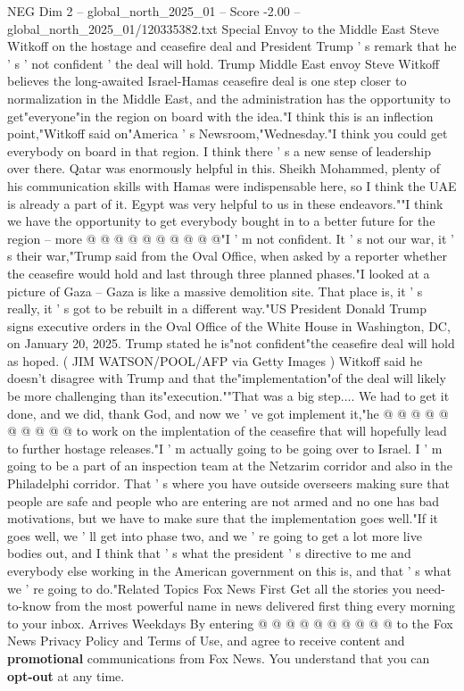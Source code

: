 \begin{textsample}{NEG Dim 2 – global\_north\_2025\_01 – Score -2.00 – global\_north\_2025\_01/120335382.txt}  \label{ex:f2_neg_080}
Special Envoy to the Middle East Steve Witkoff on the hostage and ceasefire deal and President Trump ' s remark that he ' s ' not confident ' the deal will hold.
Trump Middle East envoy Steve Witkoff believes the long-awaited Israel-Hamas ceasefire deal is one step closer to normalization in the Middle East, and the administration has the opportunity to get"everyone"in the region on board with the idea."I think this is an inflection point,"Witkoff said on"America ' s Newsroom,"Wednesday."I think you could get everybody on board in that region.
I think there ' s a new sense of leadership over there.
Qatar was enormously helpful in this.
Sheikh Mohammed, plenty of his communication skills with Hamas were indispensable here, so I think the UAE is already a part of it.
Egypt was very helpful to us in these endeavors.""I think we have the opportunity to get everybody bought in to a better future for the region -- more @ @ @ @ @ @ @ @ @ @"I ' m not confident.
It ' s not our war, it ' s their war,"Trump said from the Oval Office, when asked by a reporter whether the ceasefire would hold and last through three planned phases."I looked at a picture of Gaza -- Gaza is like a massive demolition site.
That place is, it ' s really, it ' s got to be rebuilt in a different way."US President Donald Trump signs executive orders in the Oval Office of the White House in Washington, DC, on January 20, 2025.
Trump stated he is"not confident"the ceasefire deal will hold as hoped. ( JIM WATSON/POOL/AFP via Getty Images ) Witkoff said he doesn't disagree with Trump and that the"implementation"of the deal will likely be more challenging than its"execution.""That was a big step....
We had to get it done, and we did, thank God, and now we ' ve got implement it,"he @ @ @ @ @ @ @ @ @ @ to work on the implentation of the ceasefire that will hopefully lead to further hostage releases."I ' m actually going to be going over to Israel.
I ' m going to be a part of an inspection team at the Netzarim corridor and also in the Philadelphi corridor.
That ' s where you have outside overseers making sure that people are safe and people who are entering are not armed and no one has bad motivations, but we have to make sure that the implementation goes well."If it goes well, we ' ll get into phase two, and we ' re going to get a lot more live bodies out, and I think that ' s what the president ' s directive to me and everybody else working in the American government on this is, and that ' s what we ' re going to do."Related Topics Fox News First Get all the stories you need-to-know from the most powerful name in news delivered first thing every morning to your inbox.
Arrives Weekdays By entering @ @ @ @ @ @ @ @ @ @ to the Fox News Privacy Policy and Terms of Use, and agree to receive content and \textbf{promotional} communications from Fox News.
You understand that you can \textbf{opt-out} at any time.

\end{textsample}
